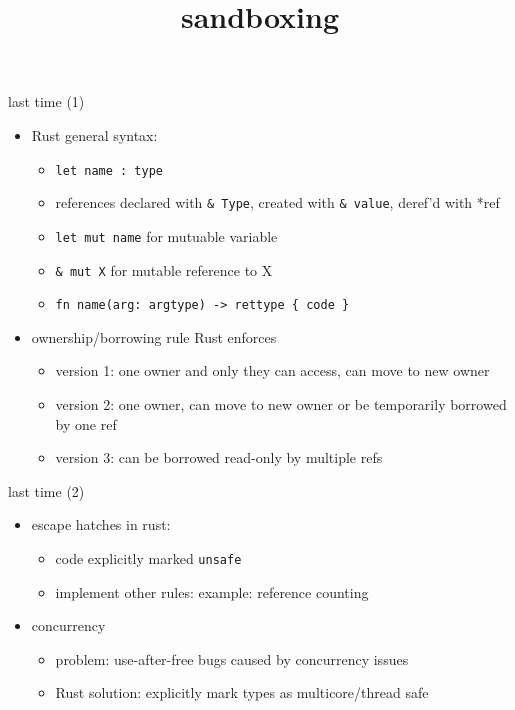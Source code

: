 \graphicspath{{./figures/}}
\title{sandboxing}
\date{}

\begin{frame}
    \titlepage
\end{frame}

\newcommand{\amp}{\textampersand}

\begin{frame}{last time (1)}
    \begin{itemize}
    \item Rust general syntax:
        \begin{itemize}
        \item \texttt{let name : type}
        \item references declared with \texttt{\& Type}, created with \texttt{\& value}, deref'd with *ref
        \item \texttt{let mut name} for mutuable variable
        \item \texttt{\& mut X} for mutable reference to X
        \item \texttt{fn name(arg: argtype) -> rettype \{ code \}}
        \end{itemize}
    \item ownership/borrowing rule Rust enforces
        \begin{itemize}
        \item version 1: one owner and only they can access, can move to new owner
        \item version 2: one owner, can move to new owner or be temporarily borrowed by one ref
        \item version 3: can be borrowed read-only by multiple refs
        \end{itemize}
    \end{itemize}
\end{frame}

\begin{frame}{last time (2)}
    \begin{itemize}
    \item escape hatches in rust:
        \begin{itemize}
        \item code explicitly marked \texttt{unsafe}
        \item implement other rules: example: reference counting
        \end{itemize}
    \item concurrency
        \begin{itemize}
        \item problem: use-after-free bugs caused by concurrency issues
        \item Rust solution: explicitly mark types as multicore/thread safe
        \end{itemize}
    \end{itemize}
\end{frame}

